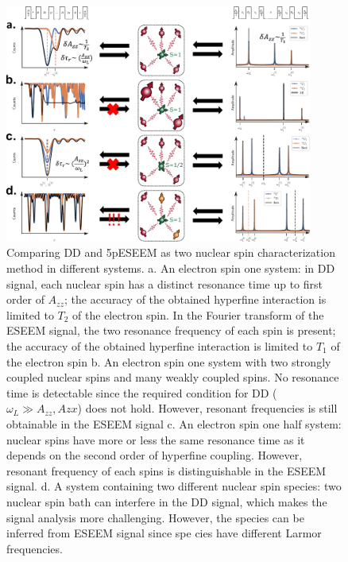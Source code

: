 \documentclass[%
 reprint,
superscriptaddress,
 amsmath,amssymb,
 aps,
]{revtex4-2}
\begin{document}
\begin{figure}%
	\begin{center}
		\includegraphics[width=0.9\textwidth]{pict/drawing0.pdf}
		\caption{Comparing DD and 5pESEEM as two nuclear spin characterization method in different systems. a. An electron spin one system: in DD signal, each nuclear spin has a distinct resonance time up to first order of $A_{zz}$; the accuracy of the obtained hyperfine interaction is limited to $T_2$ of the electron spin. In the Fourier transform of the ESEEM signal, the two resonance frequency of each spin is present; the accuracy of the obtained hyperfine interaction is limited to $T_1$ of the electron spin b. An electron spin one system with two strongly coupled nuclear spins and many weakly coupled spins. No resonance time is detectable since the required condition for DD ($\omega_L \gg A_{zz}, A{zx}$) does not hold. However, resonant frequencies is still obtainable in the ESEEM signal c. An electron spin one half system: nuclear spins have more or less the same resonance time as it depends on the second order of hyperfine coupling. However, resonant frequency of each spins is distinguishable in the ESEEM signal. d. A system containing two different nuclear spin species: two nuclear spin bath can interfere in the DD signal, which makes the signal analysis more challenging. However, the species can be inferred from ESEEM signal since spe cies have different Larmor frequencies.}
		\label{fig:1}
	\end{center}
\end{figure}




\end{document}
